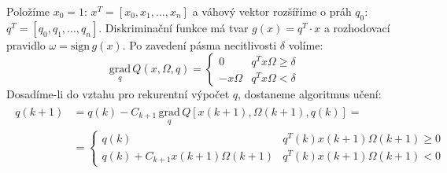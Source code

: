 Položíme $ x_0 = 1 $: $ x^T = [x_0, x_1, ..., x_n] $ a váhový vektor rozšíříme o práh $ q_0 $: $ q^T = [q_0, q_1, ..., q_n] $. Diskriminační funkce má tvar $ g(x) = q^T \cdot x $ a rozhodovací pravidlo $ \omega = \mathrm{sign} \, g(x) $. Po zavedení pásma necitlivosti $ \delta $ volíme:
\begin{equation}
\underset{q}{\mathrm{grad}} \, Q(x, \Omega, q) = \begin{cases} 0 & q^T x \Omega \geq \delta \\ -x \Omega & q^T x \Omega < \delta \end{cases}
\end{equation}
Dosadíme-li do vztahu pro rekurentní výpočet $ q $, dostaneme algoritmus učení:
\begin{align}
\begin{split}
q(k+1) &= q(k) - C_{k+1} \, \underset{q}{\mathrm{grad}} \, Q[x(k+1), \Omega(k+1), q(k)] = \\
&= \begin{cases} q(k) & q^T(k) x(k+1) \Omega(k+1) \geq 0 \\ q(k) + C_{k+1} x(k+1) \Omega(k+1) & q^T(k) x(k+1) \Omega(k+1) < 0 \end{cases}
\end{split}
\end{align}
